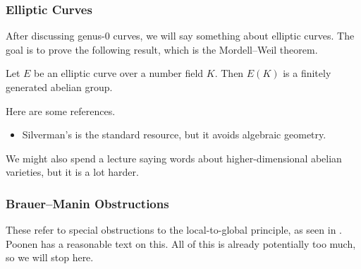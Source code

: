 \documentclass[../notes.tex]{subfiles}
\begin{document}
\subsubsection{Elliptic Curves}
After discussing genus-$0$ curves, we will say something about elliptic curves. The goal is to prove the following result, which is the Mordell--Weil theorem.
\begin{theorem}
	Let $E$ be an elliptic curve over a number field $K$. Then $E(K)$ is a finitely generated abelian group.
\end{theorem}
Here are some references.
\begin{itemize}
	\item Silverman's \cite{silverman} is the standard resource, but it avoids algebraic geometry.
\end{itemize}
We might also spend a lecture saying words about higher-dimensional abelian varieties, but it is a lot harder.

\subsubsection{Brauer--Manin Obstructions}
These refer to special obstructions to the local-to-global principle, as seen in . Poonen has a reasonable text on this. All of this is already potentially too much, so we will stop here.
\end{document}
